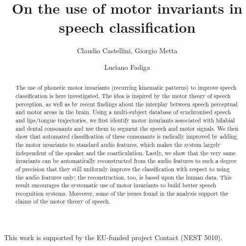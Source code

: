 \documentclass{pnastwo}
\begin{document}
\title{On the use of motor invariants in speech classification}

\author{
Claudio Castellini,
Giorgio Metta \and
Luciano Fadiga
}


\maketitle

\begin{article}

\begin{abstract}

  The use of phonetic motor invariants (recurring kinematic patterns)
  to improve speech classification is here investigated. The
  idea is inspired by the motor theory of speech perception, as well as
  by recent findings about the interplay between speech
  perceptual and motor areas in the brain. Using a multi-subject database
  of synchronised speech and lips/tongue trajectories, we first identify
  motor invariants associated with bilabial and dental consonants
  and use them to segment the speech and motor signals.
  We then show that automated classification of these
  consonants is radically improved by adding the motor invariants to
  standard audio features, which makes the system largely independent
  of the speaker and the coarticulation.
  Lastly, we show that the very same invariants can be
  automatically reconstructed from the audio features to such a degree of
  precision that they still uniformly improve the classification with
  respect to using the audio features only; the
  reconstruction, too, is based upon the human data.
  This result encourages the systematic use of motor invariants to build
  better speech recognition systems. Moreover, some of the issues found in
  the analysis support the claims of the motor theory of speech.
  
\end{abstract}









\begin{acknowledgments}
  This work is supported by the EU-funded project Contact (NEST 5010).
\end{acknowledgments}

%

\end{article}
\end{document}

